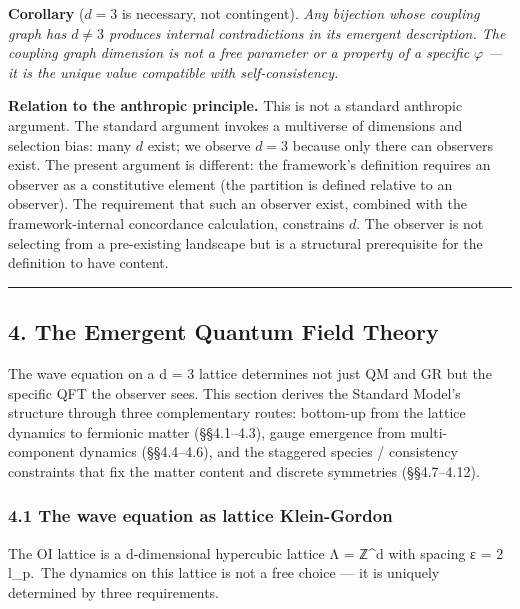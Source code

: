 \documentclass[
]{article}
\begin{document}
\textbf{Corollary} (\(d = 3\) is necessary, not contingent). \emph{Any
bijection whose coupling graph has \(d \neq 3\) produces internal
contradictions in its emergent description. The coupling graph dimension
is not a free parameter or a property of a specific \(\varphi\) --- it
is the unique value compatible with self-consistency.}

\textbf{Relation to the anthropic principle.} This is not a standard
anthropic argument. The standard argument invokes a multiverse of
dimensions and selection bias: many \(d\) exist; we observe \(d = 3\)
because only there can observers exist. The present argument is
different: the framework's definition requires an observer as a
constitutive element (the partition is defined relative to an observer).
The requirement that such an observer exist, combined with the
framework-internal concordance calculation, constrains \(d\). The
observer is not selecting from a pre-existing landscape but is a
structural prerequisite for the definition to have content.

\begin{center}\rule{0.5\linewidth}{0.5pt}\end{center}

\hypertarget{the-emergent-quantum-field-theory}{%
\subsection{4. The Emergent Quantum Field
Theory}\label{the-emergent-quantum-field-theory}}

The wave equation on a d = 3 lattice determines not just QM and GR but
the specific QFT the observer sees. This section derives the Standard
Model's structure through three complementary routes: bottom-up from the
lattice dynamics to fermionic matter (§§4.1--4.3), gauge emergence from
multi-component dynamics (§§4.4--4.6), and the staggered species /
consistency constraints that fix the matter content and discrete
symmetries (§§4.7--4.12).

\hypertarget{the-wave-equation-as-lattice-klein-gordon}{%
\subsubsection{4.1 The wave equation as lattice
Klein-Gordon}\label{the-wave-equation-as-lattice-klein-gordon}}

The OI lattice is a d-dimensional hypercubic lattice Λ = ℤ\^{}d with
spacing ε = 2 l\_p.~The dynamics on this lattice is not a free choice
--- it is uniquely determined by three requirements.
\end{document}
